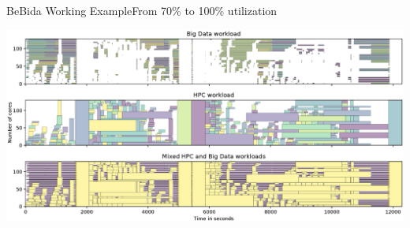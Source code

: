 \documentclass[10pt, compress, titleprogressbar, aspectratio=169]{beamer}
\begin{document}
        \begin{frame}{BeBida Working Example}{From 70\% to 100\% utilization}
            \begin{center}
                \includegraphics[width=\linewidth, height=\textheight, keepaspectratio]{./img/fig/gantt_example}
            \end{center}
        \end{frame}
\end{document}
